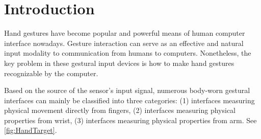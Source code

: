 \documentclass{sigchi}
\begin{document}

 



\section{Introduction}
Hand gestures have become popular and powerful means of human computer interface nowadays.
Gesture interaction can serve as an effective and natural input modality to communication from humans to computers.
Nonetheless, the key problem in these gestural input devices is how to make hand gestures recognizable by the computer.




Based on the source of the sensor's input signal, numerous body-worn gestural interfaces can mainly be classified into three categories: (1) interfaces measuring physical movement directly from fingers, (2) interfaces measuring physical properties from wrist, (3) interfaces measuring physical properties from arm. See \autoref{fig:HandTarget}.

\end{document}

